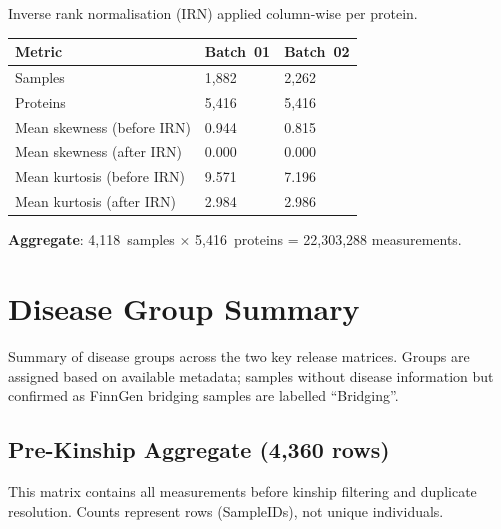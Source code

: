 \documentclass[11pt,a4paper]{article}
\begin{document}
Inverse rank normalisation (IRN) applied column-wise per protein.

{\footnotesize
\renewcommand{\arraystretch}{1.2}
\begin{longtable}{p{5cm}p{3cm}p{3cm}}
\toprule
\textbf{Metric} & \textbf{Batch~01} & \textbf{Batch~02} \\
\midrule
Samples                      & 1,882  & 2,262 \\
Proteins                     & 5,416  & 5,416 \\
Mean skewness (before IRN)   & 0.944  & 0.815 \\
Mean skewness (after IRN)    & 0.000  & 0.000 \\
Mean kurtosis (before IRN)   & 9.571  & 7.196 \\
Mean kurtosis (after IRN)    & 2.984  & 2.986 \\
\bottomrule
\end{longtable}
\renewcommand{\arraystretch}{1.0}
}

\textbf{Aggregate}: 4,118~samples $\times$ 5,416~proteins = 22,303,288
measurements.

\section{Disease Group Summary}

Summary of disease groups across the two key release matrices. Groups are
assigned based on available metadata; samples without disease information but
confirmed as FinnGen bridging samples are labelled ``Bridging''.

\subsection{Pre-Kinship Aggregate (4,360 rows)}

This matrix contains all measurements before kinship filtering and duplicate
resolution. Counts represent rows (SampleIDs), not unique individuals.
\end{document}
